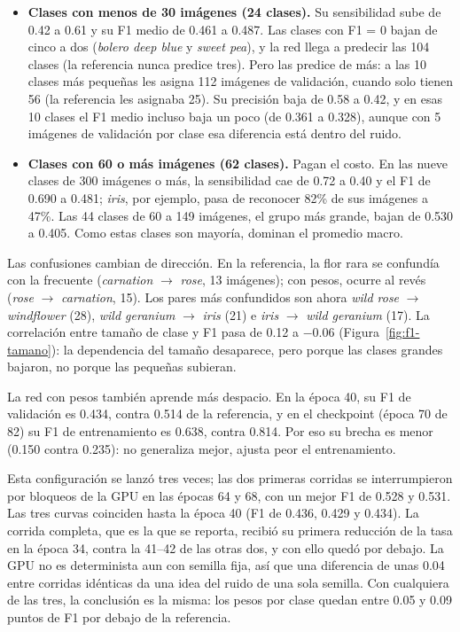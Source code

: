 \begin{itemize}
\item \textbf{Clases con menos de 30 imágenes (24 clases).} Su sensibilidad
sube de 0.42 a 0.61 y su F1 medio de 0.461 a 0.487. Las clases con F1 = 0
bajan de cinco a dos (\emph{bolero deep blue} y \emph{sweet pea}), y la red
llega a predecir las 104 clases (la referencia nunca predice tres). Pero las
predice de más: a las 10 clases más pequeñas les asigna 112 imágenes de
validación, cuando solo tienen 56 (la referencia les asignaba 25). Su precisión
baja de 0.58 a 0.42, y en esas 10 clases el F1 medio incluso baja un poco (de
0.361 a 0.328), aunque con 5 imágenes de validación por clase esa diferencia
está dentro del ruido.
\item \textbf{Clases con 60 o más imágenes (62 clases).} Pagan el costo. En las
nueve clases de 300 imágenes o más, la sensibilidad cae de 0.72 a 0.40 y el F1
de 0.690 a 0.481; \emph{iris}, por ejemplo, pasa de reconocer 82\% de sus
imágenes a 47\%. Las 44 clases de 60 a 149 imágenes, el grupo más grande, bajan
de 0.530 a 0.405. Como estas clases son mayoría, dominan el promedio macro.
\end{itemize}

Las confusiones cambian de dirección. En la referencia, la flor rara se
confundía con la frecuente (\emph{carnation} $\to$ \emph{rose}, 13 imágenes);
con pesos, ocurre al revés (\emph{rose} $\to$ \emph{carnation}, 15). Los pares
más confundidos son ahora \emph{wild rose} $\to$ \emph{windflower} (28),
\emph{wild geranium} $\to$ \emph{iris} (21) e \emph{iris} $\to$
\emph{wild geranium} (17). La correlación entre tamaño de clase y F1 pasa de
0.12 a $-0.06$ (Figura~\ref{fig:f1-tamano}): la dependencia del tamaño
desaparece, pero porque las clases grandes bajaron, no porque las pequeñas
subieran.

La red con pesos también aprende más despacio. En la época 40, su F1 de
validación es 0.434, contra 0.514 de la referencia, y en el checkpoint (época
70 de 82) su F1 de entrenamiento es 0.638, contra 0.814. Por eso su brecha es
menor (0.150 contra 0.235): no generaliza mejor, ajusta peor el entrenamiento.

Esta configuración se lanzó tres veces; las dos primeras corridas se
interrumpieron por bloqueos de la GPU en las épocas 64 y 68, con un mejor F1 de
0.528 y 0.531. Las tres curvas coinciden hasta la época 40 (F1 de 0.436, 0.429 y
0.434). La corrida completa, que es la que se reporta, recibió su primera
reducción de la tasa en la época 34, contra la 41--42 de las otras dos, y con
ello quedó por debajo. La GPU no es determinista aun con semilla fija, así que
una diferencia de unas 0.04 entre corridas idénticas da una idea del ruido de
una sola semilla. Con cualquiera de las tres, la conclusión es la misma: los
pesos por clase quedan entre 0.05 y 0.09 puntos de F1 por debajo de la
referencia.

